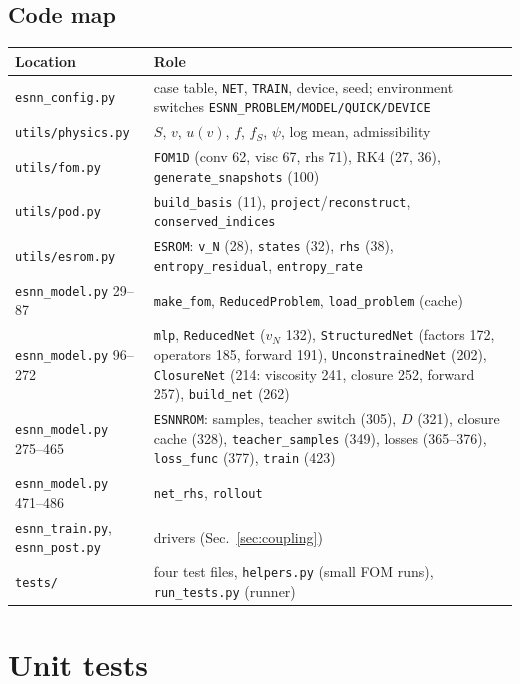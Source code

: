 \documentclass[11pt,a4paper]{article}
\newcommand{\code}[1]{\texttt{\small #1}}
\begin{document}
\subsection{Code map}
\begin{center}\small
\begin{tabular}{p{4.4cm}p{11.2cm}}
\toprule
Location & Role\\\midrule
\code{esnn\_config.py} & case table, \code{NET}, \code{TRAIN}, device, seed; environment switches \code{ESNN\_PROBLEM/MODEL/QUICK/DEVICE}\\
\code{utils/physics.py} & $S$, $v$, $u(v)$, $f$, $f_S$, $\psi$, log mean, admissibility\\
\code{utils/fom.py} & \code{FOM1D} (conv 62, visc 67, rhs 71), RK4 (27, 36), \code{generate\_snapshots} (100)\\
\code{utils/pod.py} & \code{build\_basis} (11), \code{project}/\code{reconstruct}, \code{conserved\_indices}\\
\code{utils/esrom.py} & \code{ESROM}: \code{v\_N} (28), \code{states} (32), \code{rhs} (38), \code{entropy\_residual}, \code{entropy\_rate}\\
\code{esnn\_model.py} 29--87 & \code{make\_fom}, \code{ReducedProblem}, \code{load\_problem} (cache)\\
\code{esnn\_model.py} 96--272 & \code{mlp}, \code{ReducedNet} ($v_N$ 132), \code{StructuredNet} (factors 172, operators 185, forward 191), \code{UnconstrainedNet} (202), \code{ClosureNet} (214: viscosity 241, closure 252, forward 257), \code{build\_net} (262)\\
\code{esnn\_model.py} 275--465 & \code{ESNNROM}: samples, teacher switch (305), $D$ (321), closure cache (328), \code{teacher\_samples} (349), losses (365--376), \code{loss\_func} (377), \code{train} (423)\\
\code{esnn\_model.py} 471--486 & \code{net\_rhs}, \code{rollout}\\
\code{esnn\_train.py}, \code{esnn\_post.py} & drivers (Sec.~\ref{sec:coupling})\\
\code{tests/} & four test files, \code{helpers.py} (small FOM runs), \code{run\_tests.py} (runner)\\
\bottomrule
\end{tabular}
\end{center}

\section{Unit tests}\label{sec:tests}
\end{document}
